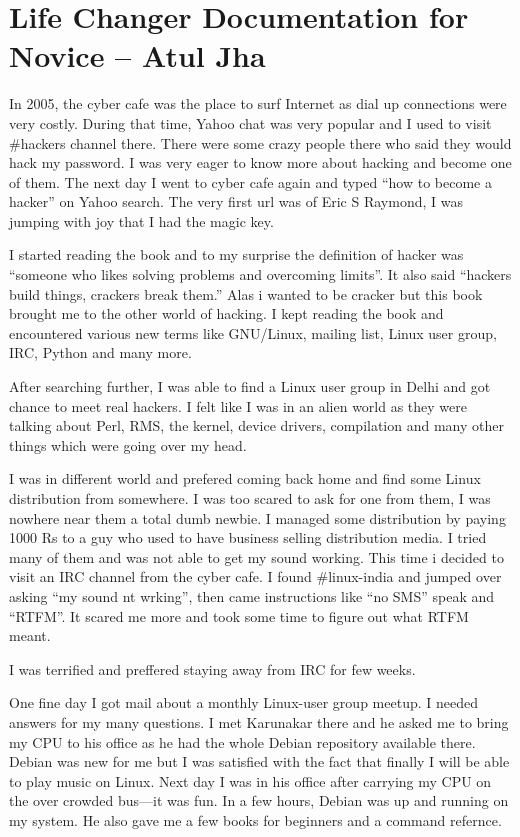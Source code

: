 \chapter{Life Changer Documentation for Novice -- Atul Jha}
In 2005, the cyber cafe was the place to surf Internet as dial up connections
were very costly. During that time, Yahoo chat was very popular and I used to
visit \#hackers channel there. There were some crazy people there who said they
would hack my password. I was very eager to know more about hacking and become
one of them. The next day I went to cyber cafe again and typed “how to become a
hacker” on Yahoo search. The very first url was of Eric S Raymond, I was jumping
with joy that I had the magic key.
 
I started reading the book and to my surprise the definition of hacker was
“someone who likes solving problems and overcoming limits”. It also said
“hackers build things, crackers break them.”  Alas i wanted to be cracker but
this book brought me to the other world of hacking. I kept reading the book and
encountered various new terms like GNU/Linux, mailing list, Linux user group,
IRC, Python and many more. 

After searching further, I was able to find a Linux user group in
Delhi and got chance to meet real hackers. I felt like I was in an
alien world as they were talking about Perl, RMS, the kernel, device
drivers, compilation and many other things which were going over my
head.

I was in different world and prefered coming back home and find some
Linux distribution from somewhere. I was too scared to ask for one
from them, I was nowhere near them a total dumb newbie. I managed some
distribution by paying 1000 Rs to a guy who used to have business
selling distribution media. I tried many of them and was not able to
get my sound working. This time i decided to visit an IRC channel from
the cyber cafe. I found \#linux-india and jumped over asking “my sound
nt wrking”, then came instructions like ``no SMS'' speak and ``RTFM''. It
scared me more and took some time to figure out what RTFM meant.

I was terrified and preffered staying away from IRC for few weeks.

One fine day I got mail about a monthly Linux-user group meetup. I
needed answers for my many questions. I met Karunakar there and he
asked me to bring my CPU to his office as he had the whole Debian
repository available there. Debian was new for me but I was
satisfied with the fact that finally I will be able to play music on
Linux.  Next day I was in his office after carrying my CPU on the over
crowded bus---it was fun. In a few hours, Debian was up and running on my
system. He also gave me a few books for beginners and a command refernce.

